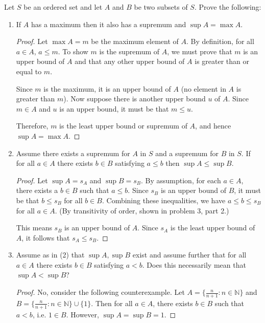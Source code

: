 \documentclass[10pt]{article}
\newcommand{\N}{\mathbb{N}}
\newenvironment{problem}[2][Problem]{\begin{trivlist}
\item[\hskip \labelsep {\bfseries #1}\hskip \labelsep {\bfseries #2.}]}{\end{trivlist}}
\begin{document}
\begin{problem}{6}
    Let $ S $ be an ordered set and let $ A $ and $ B $ be two subsets of $ S $. Prove the following:
    \begin{enumerate}
        \item If $ A $ has a maximum then it also has a supremum and $ \sup A = \max A $.
            \begin{proof}
                Let $\max A = m$ be the maximum element of $A$. By definition, for all $a \in A$, $a \leq m$. To show $m$ is the supremum of $A$, we must prove that $m$ is an upper bound of $A$ and that any other upper bound of $A$ is greater than or equal to $m$.

                Since $m$ is the maximum, it is an upper bound of $A$ (no element in $A$ is greater than $m$). Now suppose there is another upper bound $u$ of $A$. Since $m \in A$ and $u$ is an upper bound, it must be that $m \leq u$.

                Therefore, $m$ is the least upper bound or supremum of $A$, and hence $\sup A = \max A$.
            \end{proof}
        \item Assume there exists a supremum for $A$ in $S$ and a supremum for $B$ in $S$. If for all $a \in A$ there exists $b \in B$ satisfying $a \leq b$ then $\sup A \leq \sup B$.
            \begin{proof}
                Let $\sup A = s_A$ and $\sup B = s_B$. By assumption, for each $a \in A$, there exists a $b \in B$ such that $a \leq b$. Since $s_B$ is an upper bound of $B$, it must be that $b \leq s_B$ for all $b \in B$. Combining these inequalities, we have $a \leq b \leq s_B$ for all $a \in A$. (By transitivity of order, shown in problem 3, part 2.)

                This means $s_B$ is an upper bound of $A$. Since $s_A$ is the least upper bound of $A$, it follows that $s_A \leq s_B$.
            \end{proof}
        \item Assume as in (2) that $\sup A, \sup B$ exist and assume further that for all $a \in A$ there exists $b \in B$ satisfying $a < b$. Does this necessarily mean that $\sup A < \sup B$?
            \begin{proof}
                No, consider the following counterexample. Let $A = \{ \frac{n}{n+1} : n \in \N \}$ and $B = \{ \frac{n}{n+1} : n \in \N \} \cup \{ 1 \}$. Then for all $a \in A$, there exists $b \in B$ such that $a < b$, i.e. $1 \in B$. However, $\sup A = \sup B = 1$.
            \end{proof}
    \end{enumerate}
\end{problem}
\end{document}
